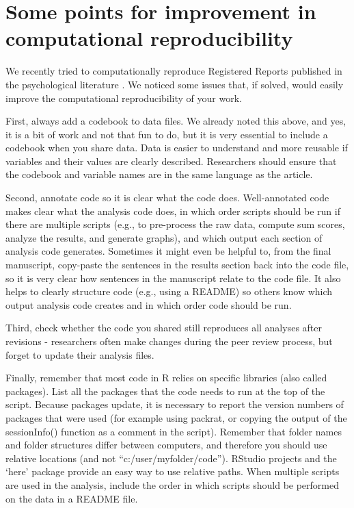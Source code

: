 \documentclass[
  oneside]{book}
\begin{document}
\hypertarget{some-points-for-improvement-in-computational-reproducibility}{%
\section{Some points for improvement in computational reproducibility}\label{some-points-for-improvement-in-computational-reproducibility}}

We recently tried to computationally reproduce Registered Reports published in the psychological literature \citep{obels_analysis_2020}. We noticed some issues that, if solved, would easily improve the computational reproducibility of your work.

First, always add a codebook to data files. We already noted this above, and yes, it is a bit of work and not that fun to do, but it is very essential to include a codebook when you share data. Data is easier to understand and more reusable if variables and their values are clearly described. Researchers should ensure that the codebook and variable names are in the same language as the article.

Second, annotate code so it is clear what the code does. Well-annotated code makes clear what the analysis code does, in which order scripts should be run if there are multiple scripts (e.g., to pre-process the raw data, compute sum scores, analyze the results, and generate graphs), and which output each section of analysis code generates. Sometimes it might even be helpful to, from the final manuscript, copy-paste the sentences in the results section back into the code file, so it is very clear how sentences in the manuscript relate to the code file. It also helps to clearly structure code (e.g., using a README) so others know which output analysis code creates and in which order code should be run.

Third, check whether the code you shared still reproduces all analyses after revisions - researchers often make changes during the peer review process, but forget to update their analysis files.

Finally, remember that most code in R relies on specific libraries (also called packages). List all the packages that the code needs to run at the top of the script. Because packages update, it is necessary to report the version numbers of packages that were used (for example using packrat, or copying the output of the sessionInfo() function as a comment in the script). Remember that folder names and folder structures differ between computers, and therefore you should use relative locations (and not ``c:/user/myfolder/code''). RStudio projects and the `here' package provide an easy way to use relative paths. When multiple scripts are used in the analysis, include the order in which scripts should be performed on the data in a README file.
\end{document}
